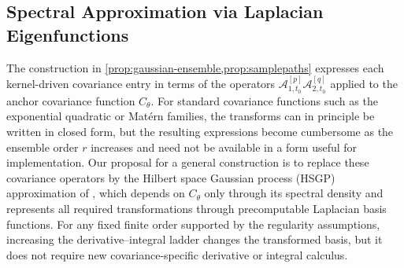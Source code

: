 \documentclass[11pt,a4paper]{article}
\theoremstyle{definition}
\theoremstyle{remark}
\begin{document}
\subsection{Spectral Approximation via Laplacian Eigenfunctions}\label{sec:finite-rank}
The construction in \cref{prop:gaussian-ensemble,prop:samplepaths} expresses each kernel-driven covariance entry in terms of the operators \(\mathcal A_{1,t_0}^{[p]}\mathcal A_{2,t_0}^{[q]}\) applied to the anchor covariance function \(C_\theta\).  For standard covariance functions such as the exponential quadratic or Mat\'ern families, the transforms can in principle be written in closed form, but the resulting expressions become cumbersome as the ensemble order \(r\) increases and need not be available in a form useful for implementation. Our proposal for a general construction is to replace these covariance operators by the Hilbert space Gaussian process (HSGP) approximation of \citet{solin2020hilbert}, which depends on \(C_\theta\) only through its spectral density and represents all required transformations through precomputable Laplacian basis functions. For any fixed finite order supported by the regularity assumptions, increasing the derivative--integral ladder changes the transformed basis, but it does not require new covariance-specific derivative or integral calculus.
\end{document}
